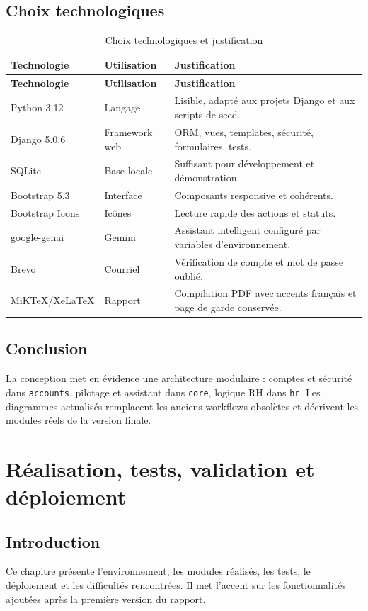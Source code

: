 \documentclass[12pt,a4paper]{report}
\begin{document}
\section{Choix technologiques}

\begin{longtable}{>{\raggedright\arraybackslash}p{3.5cm}>{\raggedright\arraybackslash}p{4cm}>{\raggedright\arraybackslash}p{6.5cm}}
\caption{Choix technologiques et justification}\label{tab:technos}\\
\toprule
\textbf{Technologie} & \textbf{Utilisation} & \textbf{Justification} \\
\midrule
\endfirsthead
\toprule
\textbf{Technologie} & \textbf{Utilisation} & \textbf{Justification} \\
\midrule
\endhead
Python 3.12 & Langage & Lisible, adapté aux projets Django et aux scripts de seed. \\
Django 5.0.6 & Framework web & ORM, vues, templates, sécurité, formulaires, tests. \\
SQLite & Base locale & Suffisant pour développement et démonstration. \\
Bootstrap 5.3 & Interface & Composants responsive et cohérents. \\
Bootstrap Icons & Icônes & Lecture rapide des actions et statuts. \\
google-genai & Gemini & Assistant intelligent configuré par variables d'environnement. \\
Brevo & Courriel & Vérification de compte et mot de passe oublié. \\
MiKTeX/XeLaTeX & Rapport & Compilation PDF avec accents français et page de garde conservée. \\
\bottomrule
\end{longtable}


\section{Conclusion}
La conception met en évidence une architecture modulaire : comptes et sécurité dans \texttt{accounts}, pilotage et assistant dans \texttt{core}, logique RH dans \texttt{hr}. Les diagrammes actualisés remplacent les anciens workflows obsolètes et décrivent les modules réels de la version finale.

\chapter{Réalisation, tests, validation et déploiement}
\section{Introduction}
Ce chapitre présente l'environnement, les modules réalisés, les tests, le déploiement et les difficultés rencontrées. Il met l'accent sur les fonctionnalités ajoutées après la première version du rapport.
\end{document}
